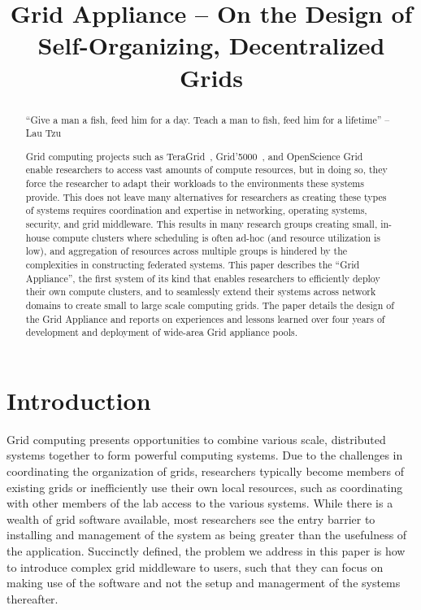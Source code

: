 \documentclass[conference]{IEEEtran}
\begin{document}
\title{Grid Appliance -- On the Design of Self-Organizing,
Decentralized Grids}

\author{
}

\maketitle


\begin{abstract}

``Give a man a fish, feed him for a day.  Teach a man to fish, feed him for a
lifetime'' -- Lau Tzu

Grid computing projects such as TeraGrid~\cite{teragrid},
Grid'5000~\cite{grid_5000}, and OpenScience Grid~\cite{osg} enable researchers
to access vast amounts of compute resources, but in doing so, they force the
researcher to adapt their workloads to the environments these systems provide.
This does not leave many alternatives for researchers as creating these types
of systems requires coordination and expertise in networking, operating
systems, security, and grid middleware.  This results in many research groups
creating small, in-house compute clusters where scheduling is often ad-hoc (and
resource utilization is low), and aggregation of resources across multiple
groups is hindered by the complexities in constructing federated systems.  This
paper describes the ``Grid Appliance'', the first system of its kind that
enables researchers to efficiently deploy their own compute clusters, and to
seamlessly extend their systems across network domains to create small to large
scale computing grids.  The paper details the design of the Grid Appliance and
reports on experiences and lessons learned over four years of development and
deployment of wide-area Grid appliance pools.

\end{abstract}

\section{Introduction}

Grid computing presents opportunities to combine various scale, distributed
systems together to form powerful computing systems.  Due to the challenges in
coordinating the organization of grids, researchers typically become members of
existing grids or inefficiently use their own local resources, such as
coordinating with other members of the lab access to the various systems.
While there is a wealth of grid software available, most researchers see the
entry barrier to installing and management of the system as being greater than
the usefulness of the application.  Succinctly defined, the problem we address
in this paper is how to introduce complex grid middleware to users, such that
they can focus on making use of the software and not the setup and managerment
of the systems thereafter.
\end{document}
